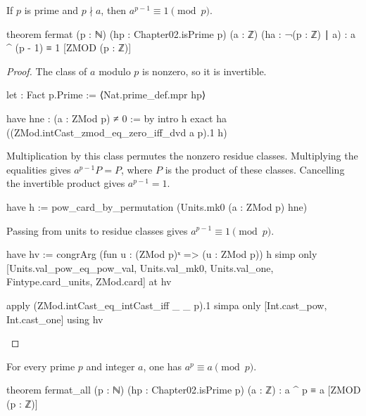 \begin{theorem}
  \label{ent:thm:fermat}
  If $p$ is prime and $p\nmid a$, then $a^{p-1}\equiv1\pmod p$.

  \begin{lean}
    theorem fermat (p : ℕ) (hp : Chapter02.isPrime p) (a : ℤ) (ha : ¬(p : ℤ) ∣ a) :
        a ^ (p - 1) ≡ 1 [ZMOD (p : ℤ)]
  \end{lean}
\end{theorem}

\begin{proof}
  The class of $a$ modulo $p$ is nonzero, so it is invertible.

  \begin{lean}
    let : Fact p.Prime := ⟨Nat.prime_def.mpr hp⟩

    have hne : (a : ZMod p) ≠ 0 := by
      intro h
      exact ha ((ZMod.intCast_zmod_eq_zero_iff_dvd a p).1 h)
  \end{lean}

  Multiplication by this class permutes the nonzero residue classes.
  Multiplying the equalities gives $a^{p-1}P=P$, where $P$ is the product of these classes.
  Cancelling the invertible product gives $a^{p-1}=1$.

  \begin{lean}
    have h := pow_card_by_permutation (Units.mk0 (a : ZMod p) hne)
  \end{lean}

  Passing from units to residue classes gives $a^{p-1}\equiv1\pmod p$.

  \begin{lean}
    have hv := congrArg (fun u : (ZMod p)ˣ => (u : ZMod p)) h
    simp only [Units.val_pow_eq_pow_val, Units.val_mk0, Units.val_one,
      Fintype.card_units, ZMod.card] at hv

    apply (ZMod.intCast_eq_intCast_iff _ _ p).1
    simpa only [Int.cast_pow, Int.cast_one] using hv
  \end{lean}
\end{proof}

\begin{theorem}
  \label{ent:thm:fermat-all}
  For every prime $p$ and integer $a$, one has $a^p\equiv a\pmod p$.

  \begin{lean}
    theorem fermat_all (p : ℕ) (hp : Chapter02.isPrime p) (a : ℤ) :
        a ^ p ≡ a [ZMOD (p : ℤ)]
  \end{lean}
\end{theorem}


